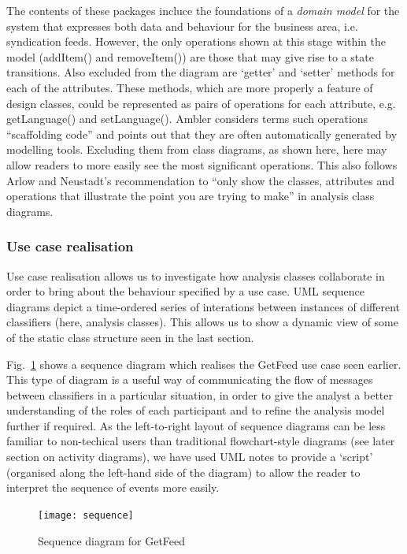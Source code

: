 \documentclass[runningheads,a4paper]{llncs}
\begin{document}
The contents of these packages incluce the foundations of a \textit{domain model} \cite{fowler2003} for the system that expresses both data and behaviour for the business area, i.e. syndication feeds. However, the only operations shown at this stage within the model (\textsf{addItem()} and \textsf{removeItem()}) are those that may give rise to a state transitions. Also excluded from the diagram are `getter' and `setter' methods for each of the attributes. These methods, which are more properly a feature of design classes, could be represented as pairs of operations for each attribute, e.g. \textsf{getLanguage()} and \textsf{setLanguage()}. Ambler \cite{ambler} considers terms such operations ``scaffolding code'' and points out that they are often automatically generated by modelling tools. Excluding them from class diagrams, as shown here, here may allow readers to more easily see the most significant operations. This also follows Arlow and Neustadt's \cite{arlow} recommendation to ``only show the classes, attributes and operations that illustrate the point you are trying to make'' in analysis class diagrams.

\subsubsection{Use case realisation}

Use case realisation allows us to investigate how analysis classes collaborate in order to bring about the behaviour specified by a use case. UML sequence diagrams depict a time-ordered series of interations between instances of different classifiers (here, analysis classes). This allows us to show a dynamic view of some of the static class structure seen in the last section.

Fig.~\ref{fig:sequence-diagram-image} shows a sequence diagram which realises the \textsf{GetFeed} use case seen earlier. This type of diagram is a useful way of communicating the flow of messages between classifiers in a particular situation, in order to give the analyst a better understanding of the roles of each participant and to refine the analysis model further if required. As the left-to-right layout of sequence diagrams can be less familiar to non-techical users than traditional flowchart-style diagrams (see later section on activity diagrams), we have used UML notes to provide a `script' (organised along the left-hand side of the diagram) to allow the reader to interpret the sequence of events more easily.

\begin{figure}
\centering
\texttt{[image: sequence]}
\caption{Sequence diagram for \textsf{GetFeed}}
\label{fig:sequence-diagram-image}
\end{figure}
\end{document}

